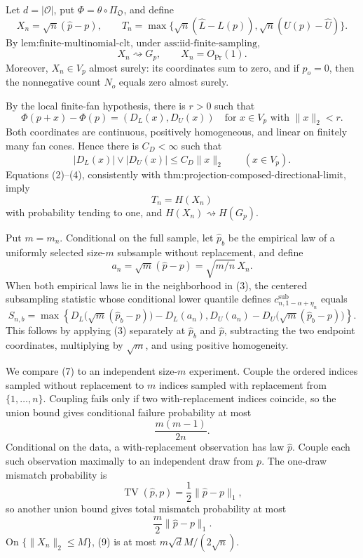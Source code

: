 Let \(d=|\mathcal O|\), put \(\Phi=\theta\circ\Pi_{\mathfrak O}\), and define
\[
X_n=\sqrt n(\widehat p-p),
\qquad
T_n=\max\{\sqrt n(\widehat L-L(p)),\sqrt n(U(p)-\widehat U)\}.
\tag{1}
\]
By \(\text{lem:finite-multinomial-clt}\), under \(\text{ass:iid-finite-sampling}\),
\[
X_n\rightsquigarrow G_p,
\qquad
X_n=O_{\Pr}(1).
\tag{2}
\]
Moreover, \(X_n\in V_p\) almost surely: its coordinates sum to zero, and if \(p_o=0\), then the nonnegative count \(N_o\) equals zero almost surely.

By the local finite-fan hypothesis, there is \(r>0\) such that
\[
\Phi(p+x)-\Phi(p)=(D_L(x),D_U(x))
\quad\text{for }x\in V_p\text{ with }\|x\|_2<r.
\tag{3}
\]
Both coordinates are continuous, positively homogeneous, and linear on finitely many fan cones.  Hence there is \(C_D<\infty\) such that
\[
|D_L(x)|\vee|D_U(x)|\leq C_D\|x\|_2
\qquad(x\in V_p).
\tag{4}
\]
Equations (2)--(4), consistently with \(\text{thm:projection-composed-directional-limit}\), imply
\[
T_n=H(X_n)
\tag{5}
\]
with probability tending to one, and \(H(X_n)\rightsquigarrow H(G_p)\).

Put \(m=m_n\).  Conditional on the full sample, let \(\widehat p_b\) be the empirical law of a uniformly selected size-\(m\) subsample without replacement, and define
\[
a_n=\sqrt m(\widehat p-p)=\sqrt{m/n}\,X_n.
\tag{6}
\]
When both empirical laws lie in the neighborhood in (3), the centered subsampling statistic whose conditional lower quantile defines \(c^{\mathrm{sub}}_{n,1-\alpha+\eta_n}\) equals
\[
S_{n,b}=\max\left\{
D_L\bigl(\sqrt m(\widehat p_b-p)\bigr)-D_L(a_n),
D_U(a_n)-D_U\bigl(\sqrt m(\widehat p_b-p)\bigr)
\right\}.
\tag{7}
\]
This follows by applying (3) separately at \(\widehat p_b\) and \(\widehat p\), subtracting the two endpoint coordinates, multiplying by \(\sqrt m\), and using positive homogeneity.

We compare (7) to an independent size-\(m\) experiment.  Couple the ordered indices sampled without replacement to \(m\) indices sampled with replacement from \(\{1,\ldots,n\}\).  Coupling fails only if two with-replacement indices coincide, so the union bound gives conditional failure probability at most
\[
\frac{m(m-1)}{2n}.
\tag{8}
\]
Conditional on the data, a with-replacement observation has law \(\widehat p\).  Couple each such observation maximally to an independent draw from \(p\).  The one-draw mismatch probability is
\[
\operatorname{TV}(\widehat p,p)=\frac12\|\widehat p-p\|_1,
\]
so another union bound gives total mismatch probability at most
\[
\frac m2\|\widehat p-p\|_1.
\tag{9}
\]
On \(\{\|X_n\|_2\leq M\}\), (9) is at most \(m\sqrt d M/(2\sqrt n)\).

